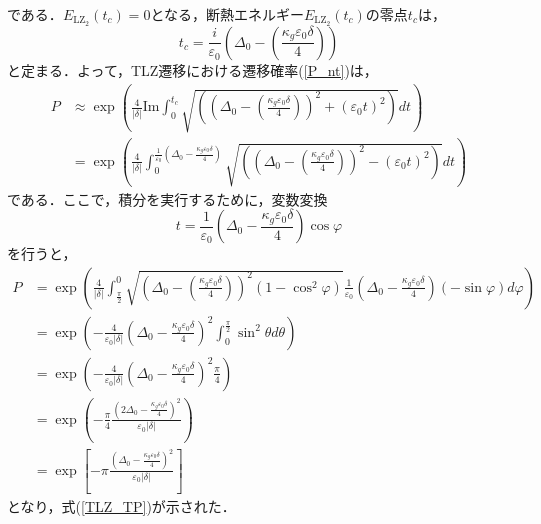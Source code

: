 である．$E_{\mathrm{LZ}_2}(t_c) = 0$となる，断熱エネルギー$E_{\mathrm{LZ}_2}(t_c)$の零点$t_c$は，
\begin{equation}
  t_c = \frac{i}{\varepsilon_0} \left( \Delta_0 - \left(\frac{\kappa_g \varepsilon_0 \delta}{4}\right) \right)
\end{equation}
と定まる．よって，TLZ遷移における遷移確率(\ref{P_nt})は，
\begin{align}
  P
  &\approx \exp \left(\frac{4}{|\delta|} \mathrm{Im} \int_0^{t_c} \sqrt{\left( \left( \Delta_0 - \left(\frac{\kappa_g \varepsilon_0 \delta }{4}\right) \right)^2 + (\varepsilon_0 t)^2 \right)} dt \right)\\
  &= \exp \left(\frac{4}{|\delta|} \int_0^{\frac{1}{\varepsilon_0} (\Delta_0 - \frac{\kappa_g \varepsilon_0 \delta}{4})} \sqrt{\left( \left( \Delta_0 - \left(\frac{\kappa_g \varepsilon_0 \delta}{4} \right)\right)^2 - (\varepsilon_0 t)^2 \right)} dt \right)
\end{align}
である．ここで，積分を実行するために，変数変換
\begin{equation}
  t = \frac{1}{\varepsilon_0} \left(\Delta_0 - \frac{\kappa_g \varepsilon_0 \delta}{4} \right) \cos \varphi
\end{equation}
を行うと，
\begin{align}
  P
  &= \exp \left(\frac{4}{|\delta|} \int_{\frac{\pi}{2}}^0 \sqrt{\left(\Delta_0 - \left(\frac{\kappa_g \varepsilon_0 \delta}{4}\right) \right)^2 (1-\cos^2\varphi)} \frac{1}{\varepsilon_0} \left( \Delta_0 - \frac{\kappa_g \varepsilon_0 \delta}{4} \right) (-\sin \varphi) d\varphi \right)\\
  &= \exp \left(-\frac{4}{\varepsilon_0 |\delta|} \left(\Delta_0 - \frac{\kappa_g \varepsilon_0 \delta}{4} \right) ^2\int_0^{\frac{\pi}{2}} \sin^2\theta d\theta \right)\\
  &= \exp \left(-\frac{4}{\varepsilon_0 |\delta|} \left(\Delta_0 - \frac{\kappa_g \varepsilon_0 \delta}{4} \right) ^2 \frac{\pi}{4} \right)\\
  &= \exp \left(-\frac{\pi}{4} \frac{(2\Delta_0-\frac{\kappa_g \varepsilon_0 \delta}{4})^2}{\varepsilon_0 |\delta|} \right)\\
  &= \exp \left[-\pi \frac{(\Delta_0 -\frac{\kappa_g \varepsilon_0 \delta}{4})^2}{\varepsilon_0 |\delta|}\right]
\end{align}
となり，式(\ref{TLZ_TP})が示された．
